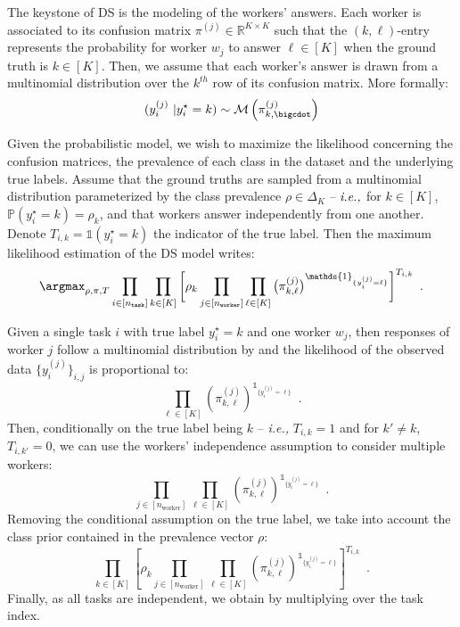 The keystone of DS is the modeling of the workers' answers.
Each worker is associated to its confusion matrix $\pi^{(j)}\in\mathbb{R}^{K\times K}$ such that the $(k,\ell)$-entry represents the probability for worker $w_j$ to answer $\ell\in[K]$ when the ground truth is $k\in[K]$.
Then, we assume that each worker's answer is drawn from a multinomial distribution over the $k^{th}$ row of its confusion matrix.
More formally:
\begin{equation}\label{eq:ds_multinomial}
    (y_i^{(j)}\ | y_i^\star = k) \sim \mathcal{M}\left(\pi^{(j)}_{k,\bigcdot}\right)
\end{equation}

Given the probabilistic model, we wish to maximize the likelihood concerning the confusion matrices, the prevalence of each class in the dataset and the underlying true labels.
Assume that the ground truths are sampled from a multinomial distribution parameterized by the class prevalence $\rho\in\Delta_K$ -- $\emph{i.e.,}$ for $k\in[K]$, $\mathbb{P}(y_i^\star=k)=\rho_k$, and that workers answer independently from one another.
Denote $T_{i,k}=\mathds{1}(y_i^\star=k)$ the indicator of the true label.
Then the maximum likelihood estimation of the DS model writes:
\begin{equation}\label{eq:ds_likelihood}
\argmax_{\rho,\pi,T}\displaystyle\prod_{i\in [n_{\texttt{task}}]}\prod_{k \in [K]}\bigg[\rho_k\prod_{j\in [n_{\texttt{worker}}]}
    \prod_{\ell\in [K]}\big(\pi^{(j)}_{k, \ell}\big)^{\mathds{1}_{\{y_i^{(j)}=\ell\}}}
    \bigg]^{T_{i,k}} \enspace.
\end{equation}

\begin{constructionbox}
Given a single task $i$ with true label $y_i^\star=k$ and one worker $w_j$, then responses of worker $j$ follow a multinomial distribution by  and the likelihood of the observed data $\{y_i^{(j)}\}_{i,j}$ is proportional to:
\begin{equation*}
    \prod_{\ell\in[K]}\left(\pi^{(j)}_{k,\ell}\right)^{\mathds{1}_{\{y_i^{(j)}=\ell\}}} \enspace.
\end{equation*}
Then, conditionally on the true label being $k$ -- \emph{i.e.,} $T_{i,k}=1$ and for $k'\neq k$, $T_{i,k'}=0$, we can use the workers' independence assumption to consider multiple workers:
\begin{equation*}
    \prod_{j\in [n_{\text{worker}}]}\prod_{\ell\in[K]}\left(\pi^{(j)}_{k,\ell}\right)^{\mathds{1}_{\{y_i^{(j)}=\ell\}}} \enspace.
\end{equation*}
Removing the conditional assumption on the true label, we take into account the class prior contained in the prevalence vector $\rho$:
\begin{equation*}
    \prod_{k\in[K]} \left[\rho_k\prod_{j\in [n_{\text{worker}}]}\prod_{\ell\in[K]}\left(\pi^{(j)}_{k,\ell}\right)^{\mathds{1}_{\{y_i^{(j)}=\ell\}}}\right]^{T_{i,k}} \enspace.
\end{equation*}
Finally, as all tasks are independent, we obtain  by multiplying over the task index.
\end{constructionbox}

